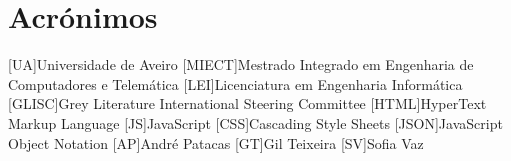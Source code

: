 \documentclass{report}
\begin{document}
\chapter*{Acrónimos}
\begin{acronym}
[UA]{Universidade de Aveiro}
[MIECT]{Mestrado Integrado em Engenharia de Computadores e Telemática}
[LEI]{Licenciatura em Engenharia Informática}
[GLISC]{Grey Literature International Steering Committee}
[HTML]{HyperText Markup Language}
[JS]{JavaScript}
[CSS]{Cascading Style Sheets}
[JSON]{JavaScript Object Notation}
[AP]{André Patacas}
[GT]{Gil Teixeira}
[SV]{Sofia Vaz}
\end{acronym}


\printbibliography
\end{document}

